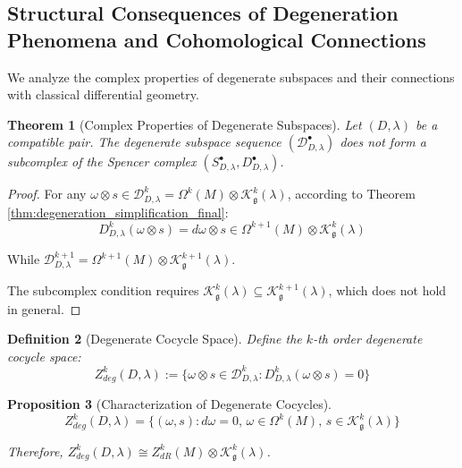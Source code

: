 \documentclass[a4paper,12pt]{extarticle}
\theoremstyle{plain}
\newtheorem{theorem}{Theorem}[section]
\newtheorem{proposition}[theorem]{Proposition}
\newtheorem{definition}[theorem]{Definition}
\theoremstyle{definition}
\begin{document}
\subsection{Structural Consequences of Degeneration Phenomena and Cohomological Connections}
\label{sec:structural_consequences}

We analyze the complex properties of degenerate subspaces and their connections with classical differential geometry.

\begin{theorem}[Complex Properties of Degenerate Subspaces]
\label{thm:degenerate_subspace_complex}
Let $(D,\lambda)$ be a compatible pair. The degenerate subspace sequence $(\mathcal{D}_{D,\lambda}^{\bullet})$ does not form a subcomplex of the Spencer complex $(S_{D,\lambda}^{\bullet}, D_{D,\lambda}^{\bullet})$.
\end{theorem}

\begin{proof}
For any $\omega \otimes s \in \mathcal{D}_{D,\lambda}^k = \Omega^k(M) \otimes \mathcal{K}_{\mathfrak{g}}^k(\lambda)$, according to Theorem \ref{thm:degeneration_simplification_final}:
$$D_{D,\lambda}^k(\omega \otimes s) = d\omega \otimes s \in \Omega^{k+1}(M) \otimes \mathcal{K}_{\mathfrak{g}}^k(\lambda)$$

While $\mathcal{D}_{D,\lambda}^{k+1} = \Omega^{k+1}(M) \otimes \mathcal{K}_{\mathfrak{g}}^{k+1}(\lambda)$.

The subcomplex condition requires $\mathcal{K}_{\mathfrak{g}}^k(\lambda) \subseteq \mathcal{K}_{\mathfrak{g}}^{k+1}(\lambda)$, which does not hold in general.
\end{proof}

\begin{definition}[Degenerate Cocycle Space]
\label{def:degenerate_cocycle_space}
Define the $k$-th order degenerate cocycle space:
$$Z_{deg}^k(D,\lambda) := \{\omega \otimes s \in \mathcal{D}_{D,\lambda}^k : D_{D,\lambda}^k(\omega \otimes s) = 0\}$$
\end{definition}

\begin{proposition}[Characterization of Degenerate Cocycles]
\label{prop:degenerate_cocycle_characterization}
$$Z_{deg}^k(D,\lambda) = \{(\omega, s) : d\omega = 0, \, \omega \in \Omega^k(M), \, s \in \mathcal{K}_{\mathfrak{g}}^k(\lambda)\}$$

Therefore, $Z_{deg}^k(D,\lambda) \cong Z^k_{dR}(M) \otimes \mathcal{K}_{\mathfrak{g}}^k(\lambda)$.
\end{proposition}
\end{document}
